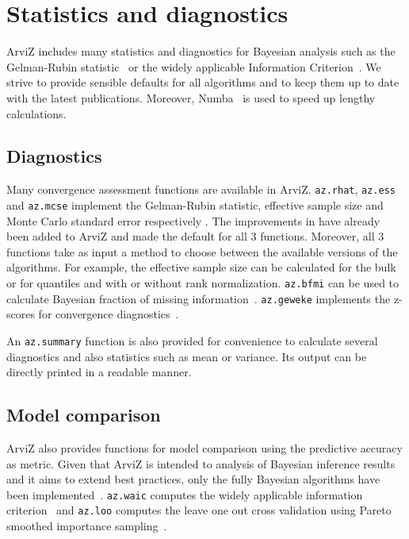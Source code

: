 \documentclass[anonymous=false, %
               format=acmsmall, %
               review=true, %
               screen=true, %
               nonacm=true]{acmart}
\begin{document}
\section{Statistics and diagnostics}\label{sec:stats}
ArviZ includes many statistics and diagnostics for Bayesian
analysis such as the Gelman-Rubin statistic~\cite{gelman1992rhat} or the
widely applicable Information Criterion~\cite{watanabe2010waic}.
We strive to provide sensible defaults for all algorithms and to
keep them up to date with the latest publications. Moreover,
Numba~\cite{lam2015numba} is used to
speed up lengthy calculations.

\subsection{Diagnostics}
Many convergence assessment functions are available in ArviZ.
\texttt{az.rhat}, \texttt{az.ess} and \texttt{az.mcse}
implement the Gelman-Rubin statistic, effective sample size and Monte Carlo
standard error respectively \cite{gelman1992rhat, gelman2013bayesian}. %
The improvements in \citet{vehtari2019rank} have already been added to
ArviZ and made the default for all 3 functions. Moreover, all 3 functions take
as input a method to choose between the available versions of the algorithms.
For example, the effective sample size can be calculated for the bulk or for
quantiles and with or without rank normalization.
\texttt{az.bfmi} can be used to calculate Bayesian fraction
of missing information~\cite{betancourt2016diagnosing}. \texttt{az.geweke}
implements the z-scores for convergence diagnostics~\cite{geweke1991evaluating}.

An \texttt{az.summary} function is also provided for convenience to calculate
several diagnostics and also statistics such as mean or variance.
Its output can be directly printed in a readable manner.

\subsection{Model comparison}
ArviZ also provides functions for model comparison using the predictive
accuracy as metric. Given that ArviZ is intended to analysis of Bayesian
inference results and it aims to extend best practices, only the fully
Bayesian algorithms have been implemented~\cite{gelman2014understanding}.
\texttt{az.waic} computes the
widely applicable information criterion~\cite{watanabe2010waic} and
\texttt{az.loo} computes the leave one out cross validation using Pareto
smoothed importance sampling~\cite{vehtari2015pareto, vehtari2017practical}.
\end{document}

